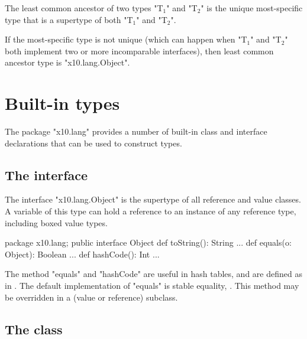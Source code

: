 The least common ancestor of two  types
\xcdmath"T$_1$" and \xcdmath"T$_2$"
is the
unique most-specific type
that is a supertype of both
\xcdmath"T$_1$" and \xcdmath"T$_2$".

If the most-specific type is not unique (which can happen when
\xcdmath"T$_1$" and \xcdmath"T$_2$" both implement two
or more incomparable interfaces), then
least common ancestor type is \xcd"x10.lang.Object".





\section{Built-in types}

The package \xcd"x10.lang" provides a number of built-in class and
interface declarations that can be used to construct types.

\subsection{The interface }
\label{Object}

The interface \xcd"x10.lang.Object" is the supertype of all
reference and value classes.
A variable of this type can hold a reference to an instance of any
reference type, including boxed value types.

\begin{xten}
package x10.lang;
public interface Object {
  def toString(): String {...}
  def equals(o: Object): Boolean {...}
  def hashCode(): Int {...}
}
\end{xten}

The method \xcd"equals" and \xcd"hashCode" are useful in hash tables,
and are defined as in \java. The default implementation of \xcd"equals"
is stable equality, . This method may be overridden
in a (value or reference) subclass.

\subsection{The class }
\label{Ref}

